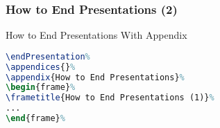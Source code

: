 \documentclass[mathserif]{beamer}%
\begin{document}
\begin{frame}[containsverbatim]%
\frametitle{How to End Presentations (2)}%
\begin{center}%
\begin{listingBlock}[0.8]{How to End Presentations With Appendix}%
\begin{lstlisting}[language=TeX]
\endPresentation%
\appendices{}%
\appendix{How to End Presentations}%
\begin{frame}%
\frametitle{How to End Presentations (1)}%
...
\end{frame}%
\end{lstlisting}%
\end{listingBlock}%
\end{center}%
\end{frame}%
%
\end{document}
